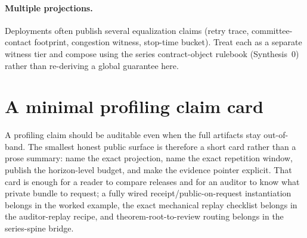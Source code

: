 \documentclass[11pt]{article}
\begin{document}
\paragraph{Multiple projections.}
Deployments often publish several equalization claims (retry trace, committee-contact footprint, congestion witness, stop-time bucket).
Treat each as a separate witness tier and compose using the series contract-object rulebook (Synthesis~0) rather than re-deriving a global guarantee here.\cite{series:contractobjects}

\section{A minimal profiling claim card}
A profiling claim should be auditable even when the full artifacts stay out-of-band.
The smallest honest public surface is therefore a short card rather than a prose summary: name the exact projection, name the exact repetition window, publish the horizon-level budget, and make the evidence pointer explicit.
That card is enough for a reader to compare releases and for an auditor to know what private bundle to request; a fully wired receipt/public-on-request instantiation belongs in the worked example, the exact mechanical replay checklist belongs in the auditor-replay recipe, and theorem-root-to-review routing belongs in the series-spine bridge.\cite{series:workedexample,series:replayrecipe,series:seriesspines}
\end{document}
